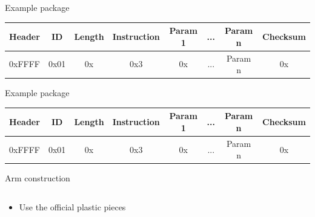 \documentclass{beamer}
\begin{document}


\begin{frame}{Example package}

    \begin{table}
        \begin{flushleft}
            \begin{tabular}{| c | c | c | c | c | c | c | c |}
                \hline
                Header & ID & Length & Instruction & Param 1 & ... & Param n & Checksum\\
                \hline
                0xFFFF & 0x01 & 0x & 0x3 & 0x & ... & Param n & 0x\\
                \hline
            \end{tabular}
        \end{flushleft}
    \end{table}
    
\end{frame}




\begin{frame}{Example package}

    \begin{table}
        \begin{flushleft}
            \begin{tabular}{| c | c | c | c | c | c | c | c |}
                \hline
                Header & ID & Length & Instruction & Param 1 & ... & Param n & Checksum\\
                \hline
                0xFFFF & 0x01 & 0x & 0x3 & 0x & ... & Param n & 0x\\
                \hline
            \end{tabular}
        \end{flushleft}
    \end{table}
    
\end{frame}


\begin{frame}{Arm construction}

    \begin{columns}
        \begin{column}[]{0.5\textwidth}
            \begin{itemize}
                \item Use the official plastic pieces
            \end{itemize}
        \end{column}
        
        
        \begin{column}[]{0.5\textwidth}
        \end{column}
    \end{columns}
    
\end{frame}
\end{document}
